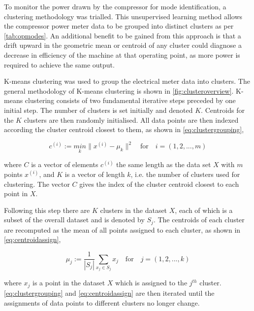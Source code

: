 To monitor the power drawn by the compressor for mode identification, a clustering methodology was trialled. This unsupervised learning method allows the compressor power meter data to be grouped into distinct clusters as per \autoref{tab:opmodes}. An additional benefit to be gained from this approach is that a drift upward in the geometric mean or centroid of any cluster could diagnose a decrease in efficiency of the machine at that operating point, as more power is required to achieve the same output.

K-means clustering was used to group the electrical meter data into clusters. The general methodology of K-means clustering is shown in \autoref{fig:clusteroverview}. K-means clustering consists of two fundamental iterative steps preceded by one initial step. The number of clusters is set initially and denoted $K$. Centroids for the $K$ clusters are then randomly initialised. All data points are then indexed according the cluster centroid closest to them, as shown in \autoref{eq:clustergrouping},

\begin{equation}
c^{(i)}  := \underset{k}{min}  \lVert {x^{(i)} - \mu_k} \rVert ^2 \quad \text{for} \quad i = (1, 2, ..., m)
\label{eq:clustergrouping}
\end{equation}

where $C$ is a vector of elements $c^{(i)}$ the same length as the data set $X$ with $m$ points $x^{(i)}$, and $K$ is a vector of length $k$, i.e. the number of clusters used for clustering. The vector $C$ gives the index of the cluster centroid closest to each point in $X$.

Following this step there are $K$ clusters in the dataset $X$, each of which is a subset of the overall dataset and is denoted by $S_j$. The centroids of each cluster are recomputed as the mean of all points assigned to each cluster, as shown in \autoref{eq:centroidassign},

\begin{equation}
\mu_j := \frac{1}{|S_j|}\sum_{x_j \in S_j} x_j \quad \text{for} \quad j = (1, 2, ..., k)
\label{eq:centroidassign}
\end{equation}

where $x_j$ is a point in the dataset $X$ which is assigned to the $j^{th}$ cluster. \autoref{eq:clustergrouping} and \autoref{eq:centroidassign} are then iterated until the assignments of data points to different clusters no longer change.

